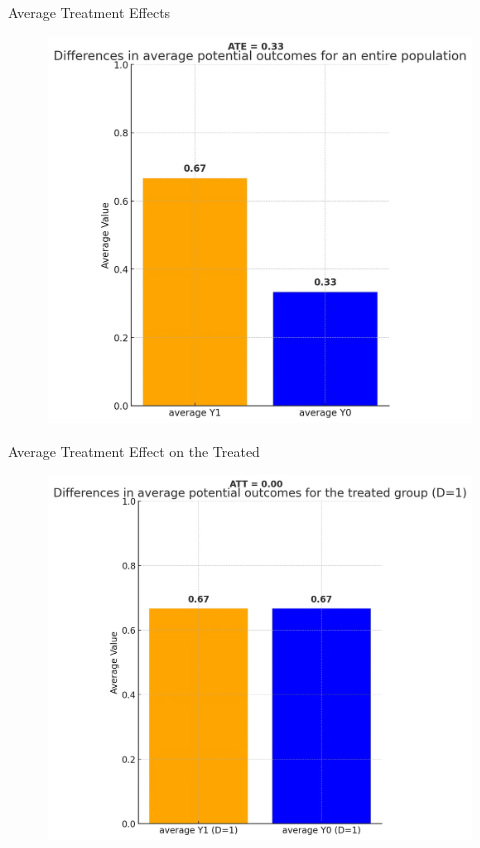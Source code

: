 \documentclass{beamer}
\begin{document}
\begin{frame}{Average Treatment Effects}

\begin{figure}
    \centering
    \includegraphics[height=0.8\textheight]{./lecture_includes/step1_y1y0}
\end{figure}


\end{frame}

\begin{frame}{Average Treatment Effect on the Treated}

\begin{figure}
    \centering
    \includegraphics[height=0.8\textheight]{./lecture_includes/step1_att}
\end{figure}


\end{frame}
\end{document}
